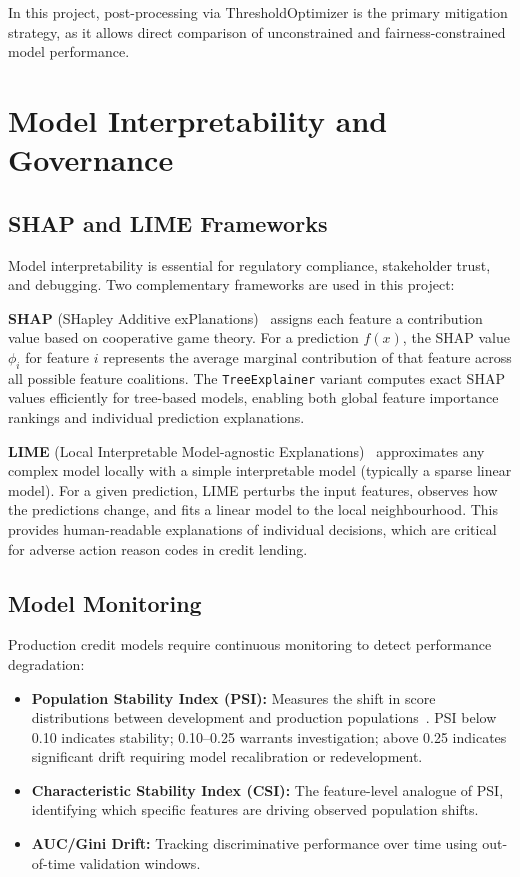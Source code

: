 In this project, post-processing via ThresholdOptimizer is the primary mitigation strategy, as it allows direct comparison of unconstrained and fairness-constrained model performance.

\section{Model Interpretability and Governance}
\label{sec:interpretability_lit}

\subsection{SHAP and LIME Frameworks}

Model interpretability is essential for regulatory compliance, stakeholder trust, and debugging. Two complementary frameworks are used in this project:

\textbf{SHAP} (SHapley Additive exPlanations)~\cite{lundberg2017} assigns each feature a contribution value based on cooperative game theory. For a prediction $f(x)$, the SHAP value $\phi_i$ for feature $i$ represents the average marginal contribution of that feature across all possible feature coalitions. The \texttt{TreeExplainer} variant computes exact SHAP values efficiently for tree-based models, enabling both global feature importance rankings and individual prediction explanations.

\textbf{LIME} (Local Interpretable Model-agnostic Explanations)~\cite{ribeiro2016} approximates any complex model locally with a simple interpretable model (typically a sparse linear model). For a given prediction, LIME perturbs the input features, observes how the predictions change, and fits a linear model to the local neighbourhood. This provides human-readable explanations of individual decisions, which are critical for adverse action reason codes in credit lending.

\subsection{Model Monitoring}

Production credit models require continuous monitoring to detect performance degradation:

\begin{itemize}
    \item \textbf{Population Stability Index (PSI):} Measures the shift in score distributions between development and production populations~\cite{yurdakul2020}. PSI below 0.10 indicates stability; 0.10--0.25 warrants investigation; above 0.25 indicates significant drift requiring model recalibration or redevelopment.
    \item \textbf{Characteristic Stability Index (CSI):} The feature-level analogue of PSI, identifying which specific features are driving observed population shifts.
    \item \textbf{AUC/Gini Drift:} Tracking discriminative performance over time using out-of-time validation windows.
\end{itemize}

